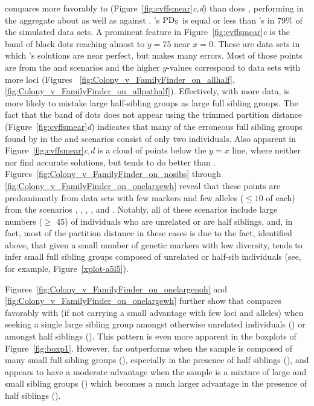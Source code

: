 \familyfinder{} compares more favorably to \colony{} (Figure~\ref{fig:cvffsmear}{\em c,d}) than does 
\kinalyzer{}, performing in the aggregate about as well as \prt{} against \colony{}. 
\colony{}'s $\mathrm{PD_S}$ is equal or less than \familyfinder{}'s in 79\% of the simulated data sets.
A prominent feature in Figure~\ref{fig:cvffsmear}{\em c} is the band of black dots reaching almost to 
$y=75$ near $x=0$.  These are data sets in which \colony{}'s solutions are near perfect, but 
\familyfinder{} makes many errors.  Most of those points are from the \allhalf{} and \allpathalf{} 
scenarios and the higher $y$-values correspond to data sets with more loci (Figures~
\ref{fig:Colony_v_FamilyFinder_on_allhalf}, \ref{fig:Colony_v_FamilyFinder_on_allpathalf}).  
Effectively, with more data, \familyfinder{} is more likely to mistake large half-sibling groups as 
large full sibling groups.  The fact that the band of dots does not appear using the trimmed partition 
distance (Figure~\ref{fig:cvffsmear}{\em d}) indicates that many of the erroneous full sibling groups 
found by \familyfinder{} in the \allhalf{} and \allpathalf{} scenarios consist of only two individuals.   
Also apparent in Figure~\ref{fig:cvffsmear}{\em c,d} is a cloud of points below the $y=x$ line, where 
neither \familyfinder{} nor \colony{} find accurate solutions, but \familyfinder{} tends to do better 
than \colony{}.  Figures~\ref{fig:Colony_v_FamilyFinder_on_nosibs} through 
\ref{fig:Colony_v_FamilyFinder_on_onelargewh} reveal that these points are predominantly from data sets 
with few markers and few alleles ($\leq 10$ of each) from the scenarios \allhalf{}, \allpathalf{}, 
\nosibs{}, \onelargenoh{}, and \onelargewh{}\@.  Notably, all of these scenarios include large numbers 
($\geq$ 45) of individuals who are unrelated or are half siblings, and, in fact, most of the partition 
distance in these cases is due to the fact, identified above, that given a small number of genetic 
markers with low diversity, \colony{} tends to infer small full sibling groups composed of unrelated or 
half-sib individuals (see, for example, Figure~\ref{xplot-a5l5}).  

Figures~\ref{fig:Colony_v_FamilyFinder_on_onelargenoh} and 
\ref{fig:Colony_v_FamilyFinder_on_onelargewh} further show that \familyfinder{} compares favorably with 
\colony{} (if not carrying a small advantage with few loci and alleles) when seeking a single large sibling group amongst 
otherwise unrelated individuals (\onelargenoh) or amongst half siblings (\onelargewh).  This pattern is 
even more apparent in the boxplots of Figure~\ref{fig:boxp1}.  However, \colony{} far outperforms 
\familyfinder{} when the sample is composed of many small full sibling groups (\sfsnoh), especially in 
the presence of half siblings (\sfswh), and \colony{} appears to have a moderate advantage when the 
sample is a mixture of large and small sibling groups (\slfsgnoh) which becomes a much larger advantage 
in the presence of half siblings (\slfsgwh).

